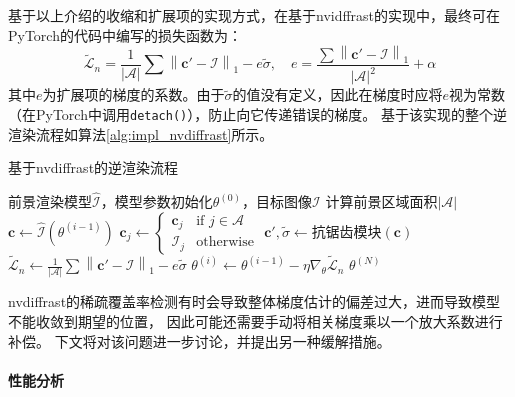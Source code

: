 基于以上介绍的收缩和扩展项的实现方式，在基于nvidffrast的实现中，最终可在PyTorch的代码中编写的损失函数为：
\begin{equation}
\tilde{\mathcal{L}}_n = \frac{1}{|\mathcal{A}|} \sum \left\| \mathbf{c}' - \mathcal{I} \right\|_1 - e \tilde{\sigma},
\quad e = \frac{\sum\left\| \mathbf{c}' - \mathcal{I} \right\|_1}{|\mathcal{A}|^2}+\alpha
\label{eq:loss_n_impl}
\end{equation}
其中$e$为扩展项的梯度的系数。由于$\tilde{\sigma}$的值没有定义，因此在梯度时应将$e$视为常数（在PyTorch中调用\texttt{detach()}），防止向它传递错误的梯度。
基于该实现的整个逆渲染流程如算法\ref{alg:impl_nvdiffrast}所示。
\begin{algorithm}[t]
    \caption{基于nvdiffrast的逆渲染流程}
    \label{alg:impl_nvdiffrast}
    \begin{algorithmic}[1]
        \Require 前景渲染模型$\hat{\mathcal{I}}$，模型参数初始化$\theta^{(0)}$，目标图像$\mathcal{I}$
            \State 计算前景区域面积$|\mathcal{A}|$
                \State $\mathbf{c} \gets \hat{\mathcal{I}}\left(\theta^{(i-1)}\right)$
                \State $\mathbf{c}_j \gets \begin{cases} \mathbf{c}_j &\text{if } j\in\mathcal{A} \\ \mathcal{I}_j &\text{otherwise} \end{cases}$
                \State $\mathbf{c}', \tilde{\sigma} \gets \text{抗锯齿模块}(\mathbf{c})$
                \State $\tilde{\mathcal{L}}_n \gets \frac{1}{|\mathcal{A}|} \sum \left\| \mathbf{c}' - \mathcal{I} \right\|_1 - e \tilde{\sigma}$
                \State $\theta^{(i)} \gets \theta^{(i-1)} - \eta \nabla_{\theta} \tilde{\mathcal{L}}_n$
            \EndFor
            \State \Return $\theta^{(N)}$
        \EndProcedure
    \end{algorithmic}
\end{algorithm}

nvdiffrast的稀疏覆盖率检测有时会导致整体梯度估计的偏差过大，进而导致模型不能收敛到期望的位置，
因此可能还需要手动将相关梯度乘以一个放大系数进行补偿。
下文将对该问题进一步讨论，并提出另一种缓解措施。

\paragraph{性能分析}

